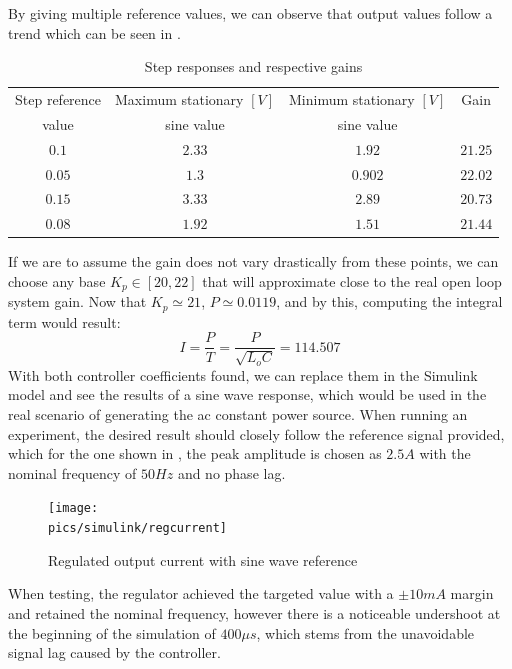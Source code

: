 By giving multiple reference values, we can observe that output values follow a trend which can be seen in .
\begin{table}[ht!]
\begin{center}
\begin{tabular}{|c|c|c|c|}
\hline
Step reference&Maximum stationary $[V]$&Minimum stationary $[V]$&Gain \\
value&sine value&sine value& \\ \hline
$0.1$&$2.33$&$1.92$&$21.25$ \\ \hline
$0.05$&$1.3$&$0.902$&$22.02$ \\ \hline
$0.15$&$3.33$&$2.89$&$20.73$ \\ \hline
$0.08$&$1.92$&$1.51$&$21.44$ \\ \hline
\end{tabular}
\end{center}
\caption{Step responses and respective gains}
\label{tab:stepvals}
\end{table}
If we are to assume the gain does not vary drastically from these points, we can choose any base $K_p \in [20, 22]$ that will approximate close to the real open loop system gain.
Now that $K_p \simeq 21$, $P \simeq 0.0119$, and by this, computing the integral term would result:
\begin{equation}
    I = \frac{P}{T} = \frac{P}{\sqrt{L_o C}} = 114.507
\end{equation}
With both controller coefficients found, we can replace them in the Simulink model and see the results of a sine wave response, which would be used in the real scenario of generating the \gls{ac} constant power source.
When running an experiment, the desired result should closely follow the reference signal provided, which for the one shown in , the peak amplitude is chosen as $2.5A$ with the nominal frequency of $50Hz$ and no phase lag.
\begin{figure}[!ht]
    \begin{center}\texttt{[image: \\pics/simulink/regcurrent]}\end{center}
    \caption{Regulated output current with sine wave reference}
    \label{fig:regcurrent}
\end{figure}
When testing, the regulator achieved the targeted value with a $\pm 10mA$ margin and retained the nominal frequency, however there is a noticeable undershoot at the beginning of the simulation of $400\mu s$, which stems from the unavoidable signal lag caused by the controller.
